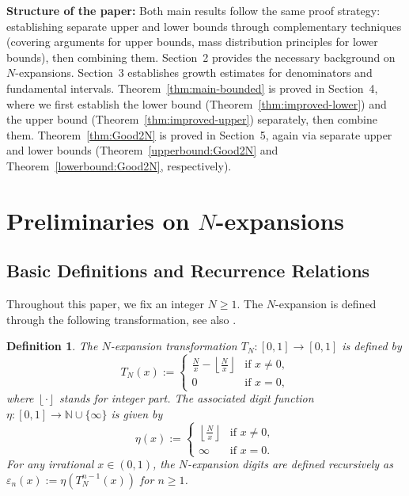 \documentclass[12pt]{article}
\newtheorem{definition}[theorem]{Definition}
\newcommand{\N}{\mathbb{N}}
\numberwithin{equation}{section}
\begin{document}
\noindent
\textbf{Structure of the paper:} Both main results follow the same proof strategy: establishing separate upper and lower bounds through complementary techniques (covering arguments for upper bounds, mass distribution principles for lower bounds), then combining them. Section~2 provides the necessary background on $N$-expansions. Section~3 establishes growth estimates for denominators and fundamental intervals. Theorem~\ref{thm:main-bounded} is proved in Section~4, where we first establish the lower bound (Theorem~\ref{thm:improved-lower}) and the upper bound (Theorem~\ref{thm:improved-upper}) separately, then combine them. Theorem~\ref{thm:Good2N} is proved in Section~5, again via separate upper and lower bounds (Theorem~\ref{upperbound:Good2N} and Theorem~\ref{lowerbound:Good2N}, respectively).


\section{Preliminaries on $N$-expansions}

\subsection{Basic Definitions and Recurrence Relations}

Throughout this paper, we fix an integer $N \geq 1$. The $N$-expansion is defined through the following transformation, {see also \cite{DKL, DKvdW}}.

\begin{definition}
The \emph{$N$-expansion transformation} $T_N: [0,1] \to [0,1]$ is defined by
\[
T_N(x) := 
\begin{cases}
\frac{N}{x} - \left\lfloor \frac{N}{x} \right\rfloor & \text{if } x \neq 0, \\
0 & \text{if } x = 0,
\end{cases}
\]
where $\left\lfloor \cdot \right\rfloor$ stands for integer part. 
The associated \emph{digit function} $\eta: [0,1] \to \N \cup \{\infty\}$ is given by
\[
\eta(x) := 
\begin{cases}
\left\lfloor \frac{N}{x} \right\rfloor & \text{if } x \neq 0, \\
\infty & \text{if } x = 0.
\end{cases}
\]
For any irrational $x \in (0,1)$, the {$N$-expansion digits} are defined recursively as $\varepsilon_n(x) := \eta(T_N^{n-1}(x))$ for $n \geq 1$.
\end{definition}
\end{document}
